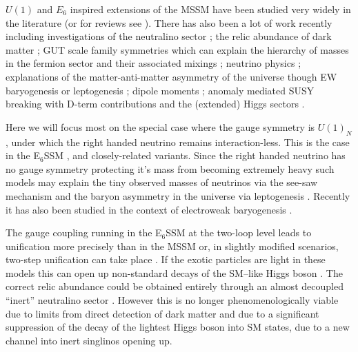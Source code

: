 \documentclass[preprint,amsmath,amssymb,aps,superscriptaddress,prd,showpacs,floatfix,nofootinbib]{revtex4-1}
\begin{document}
$U(1)$ and $E_6$ inspired extensions of the MSSM have been studied
very widely in the literature \cite{Gunion:1989we, Gunion:1992hs,
  Binetruy:1985xm, Ellis:1986yg, Ibanez:1986si, Gunion:1986ky,
  Haber:1986gz, Baer:1987eb, Gunion:1987jd, Grifols:1986vr,
  Ellis:1986ip, Morris:1987fm, Drees:1987tp, Ma:1995xk,
  Suematsu:1997tv, Suematsu:1997qt, Suematsu:1997au, Keith:1996fv,
  Keith:1997zb, Gherghetta:1996yr, Demir:1998dk, Langacker:1998tc,
  Hambye:2000bn, Ma:2000jf} (or for reviews see
\cite{Hewett:1988xc,Langacker:2008yv}).  There has also been a lot of
work recently including investigations of the neutralino sector
\cite{Hesselbach:2001ri, Barger:2005hb, Choi:2006fz,
  Barger:2007nv}; the relic abundance of dark matter
\cite{Kalinowski:2008iq}; GUT scale family symmetries which can
explain the hierarchy of masses in the fermion sector and their
associated mixings \cite{Stech:2008wd}; neutrino physics
\cite{Kang:2004ix}; explanations of the matter-anti-matter asymmetry
of the universe though EW baryogenesis or leptogenesis
\cite{Hambye:2000bn,Ma:2000jf,Kang:2004pp}; dipole moments
\cite{GutierrezRodriguez:2006hb}; anomaly mediated SUSY breaking with
D-term contributions \cite{Asano:2008ju} and the (extended) Higgs
sectors \cite{Daikoku:2000ep,Ham:2008xf}.



Here we will focus most on the special case where the gauge symmetry
is $U(1)_N$, under which the right handed neutrino remains
interaction-less. This is the case in the E$_6$SSM
\cite{King:2005jy,King:2005my,Athron:2010zz}, and closely-related
variants\cite{Howl:2007zi, Braam:2009fi, Braam:2010sy, Hall:2011zq,
  Nevzorov:2012hs, Athron:2014pua}.  Since the right handed neutrino
has no gauge symmetry protecting it's mass from becoming extremely
heavy such models may explain the tiny observed masses of neutrinos
via the see-saw mechanism and the baryon asymmetry in the universe via
leptogenesis \cite{Hambye:2000bn,King:2008qb, King:2008gw}.  Recently
it has also been studied in the context of electroweak baryogenesis
\cite{Chao:2014hya}.

The gauge coupling running in the E$_6$SSM at the two-loop level leads
to unification more precisely than in the MSSM \cite{King:2007uj} or,
in slightly modified scenarios, two-step unification can take place
\cite{Howl:2007hq,Howl:2007zi}. If the exotic particles are light in
these models this can open up non-standard decays of the SM--like
Higgs boson \cite{Hall:2010ix,Nevzorov:2013tta,Athron:2014pua}. The
correct relic abundance could be obtained entirely through an almost
decoupled ``inert'' neutralino sector \cite{Hall:2009aj}.  However
this is no longer phenomenologically viable due to limits from direct
detection of dark matter
\cite{2011PhRvL.107m1302A,2012PhRvL.109r1301A, Akerib:2013tjd} and due
to a significant suppression of the decay of the lightest Higgs boson
into SM states, due to a new channel into inert singlinos opening up.
\end{document}
